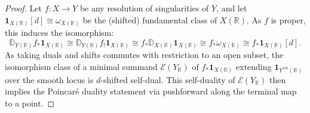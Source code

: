 \documentclass[10pt,a4paper]{amsart}
\begin{document}
\begin{proof}
Let $f:X\to Y$ be any resolution of singularities of $Y$, and let  $\mathbf{1}_{X(\mathbb{R})}[d]\cong \omega_{X(\mathbb{R})}$ be the (shifted) fundamental class of $X(\mathbb{R})$. As $f$ is proper, this induces the isomorphism:
\[\mathbb{D}_{Y(\mathbb{R})}f_*\mathbf{1}_{X(\mathbb{R})}\cong \mathbb{D}_{Y(\mathbb{R})} f_!\mathbf{1}_{X(\mathbb{R})}\cong f_*\mathbb{D}_{X(\mathbb{R})}\mathbf{1}_{X(\mathbb{R})}\cong f_*\omega_{X(\mathbb{R})}\cong f_*\mathbf{1}_{X(\mathbb{R})}[d].\]
As taking duals and shifts commutes with restriction to an open subset, the isomorphism class of a minimal summand $\mathscr{E}(Y_\mathbb{R})$ of $f_*\mathbf{1}_{X(\mathbb{R})}$ extending $\mathbf{1}_{Y^{sm}(\mathbb{R})}$ over the smooth locus is $d$-shifted self-dual. This self-duality of $\mathscr{E}(Y_\mathbb{R})$ then implies the Poincaré duality statement via pushforward along the terminal map to a point.
\end{proof}
\end{document}

